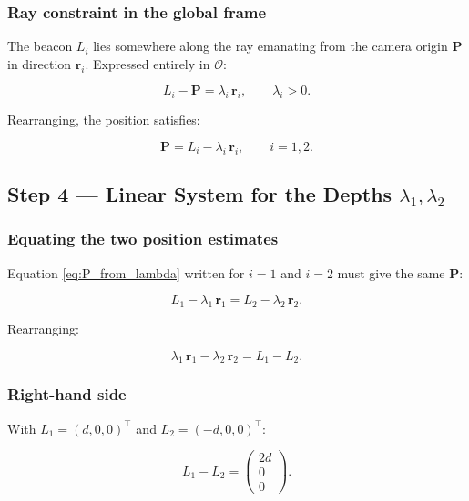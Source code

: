 \documentclass[12pt, a4paper]{article}
\begin{document}
\subsubsection{Ray constraint in the global frame}
The beacon $L_i$ lies somewhere along the ray emanating from the camera
origin $\mathbf{P}$ in direction $\mathbf{r}_i$. Expressed entirely in
$\mathcal{O}$:

\begin{equation}
L_i - \mathbf{P} = \lambda_i\,\mathbf{r}_i, \qquad \lambda_i > 0.
\label{eq:ray_constraint}
\end{equation}

Rearranging, the position satisfies:

\begin{equation}
\boxed{\mathbf{P} = L_i - \lambda_i\,\mathbf{r}_i, \qquad i = 1, 2.}
\label{eq:P_from_lambda}
\end{equation}
\subsection{Step 4 — Linear System for the Depths $\lambda_1, \lambda_2$}

\subsubsection{Equating the two position estimates}
Equation \eqref{eq:P_from_lambda} written for $i=1$ and $i=2$ must give the
same $\mathbf{P}$:

\begin{equation}
L_1 - \lambda_1\,\mathbf{r}_1 = L_2 - \lambda_2\,\mathbf{r}_2.
\end{equation}

Rearranging:

\begin{equation}
\lambda_1\,\mathbf{r}_1 - \lambda_2\,\mathbf{r}_2 = L_1 - L_2.
\label{eq:sys}
\end{equation}

\subsubsection{Right-hand side}
With $L_1 = (d,0,0)^\top$ and $L_2 = (-d,0,0)^\top$:

\begin{equation}
L_1 - L_2 = \begin{pmatrix} 2d \\ 0 \\ 0 \end{pmatrix}.
\end{equation}
\end{document}
